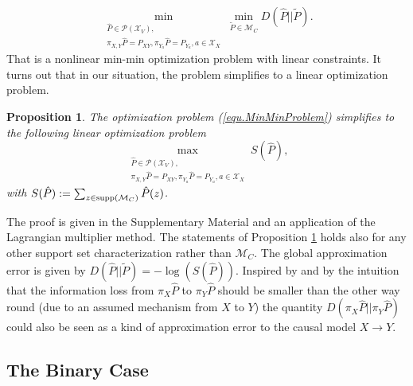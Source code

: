 \documentclass[letterpaper]{article}
\newcommand{\kM}{\mathcal{M}}   %
\newcommand{\kP}{\mathcal{P}}   %
\newcommand{\kX}{\mathcal{X}}   %
\newtheorem{Satz}{Proposition}
\newcommand{\supp}{{\rm supp}}
\begin{document}
\begin{equation} \label{equ.MinMinProblem}
\min_{\substack{\hat P \in \kP(\kX_V),\\ \pi_{X,Y} \hat P = P_{XY}, \pi_{Y_{a}} \hat P = P_{Y_{a}},a\in \kX_X}} \min_{\tilde P \in \kM_C} D(\hat P|| \tilde P).
\end{equation}
That is a nonlinear min-min optimization problem with linear constraints. It turns out that in our situation, the problem simplifies to a linear optimization problem.

\begin{Satz} \label{prop.approx_solution}
The optimization problem (\ref{equ.MinMinProblem}) simplifies to the following linear optimization problem
$$
\max_{\substack{\hat P \in \kP(\kX_V),\\ \pi_{X,Y} \hat P = P_{XY}, \pi_{Y_{a}} \hat P = P_{Y_{a}},a\in \kX_X}} S(\hat P),
$$
with $S(\hat P):= \sum_{z \in \supp(\kM_C)} \hat P(z)$.
\end{Satz}
The proof is given in the Supplementary Material and an application of the Lagrangian multiplier method. The statements of Proposition \ref{prop.approx_solution} holds also for any other support set characterization rather than $\kM_C$. The global approximation error is given by $D(\hat P || \tilde P) = -\log(S(\hat P))$. Inspired by \cite{JMZLZDSS12, DJMZSZS10, JBGS13} and by the intuition that the information loss from $\pi_X \hat P$ to $\pi_Y \hat P$ should be smaller than the other way round (due to an assumed mechanism from $X$ to $Y$) the quantity $D(\pi_X \hat P || \pi_Y \hat P)$ could also be seen as a kind of approximation error to the causal model $X \rightarrow Y$.

\subsection{The Binary Case} \label{sec.binary_case}
\end{document}

